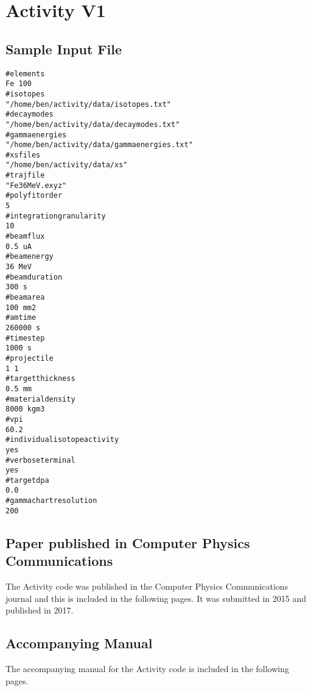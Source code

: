 \chapter{Activity V1}

\section{Sample Input File}
\label{section:sampleinputfileactivity1}


\begin{lstlisting}[style=sOutputFile,caption={Activity V1 Input File}]
#elements
Fe 100
#isotopes
"/home/ben/activity/data/isotopes.txt"
#decaymodes
"/home/ben/activity/data/decaymodes.txt"
#gammaenergies
"/home/ben/activity/data/gammaenergies.txt"
#xsfiles
"/home/ben/activity/data/xs"
#trajfile
"Fe36MeV.exyz"
#polyfitorder
5
#integrationgranularity
10
#beamflux
0.5 uA
#beamenergy
36 MeV
#beamduration
300 s
#beamarea
100 mm2
#amtime
260000 s
#timestep
1000 s
#projectile
1 1
#targetthickness
0.5 mm
#materialdensity
8000 kgm3
#vpi
60.2
#individualisotopeactivity
yes
#verboseterminal
yes
#targetdpa
0.0
#gammachartresolution
200
\end{lstlisting}

\FloatBarrier





\section{Paper published in Computer Physics Communications}
\label{section:activityv1published}

The Activity code was published in the Computer Physics Communications journal and this is included in the following pages.  It was submitted in 2015 and published in 2017.

\clearpage



\FloatBarrier

\section{Accompanying Manual}
\label{section:activityv1manual}

The accompanying manual for the Activity code is included in the following pages.

\clearpage












